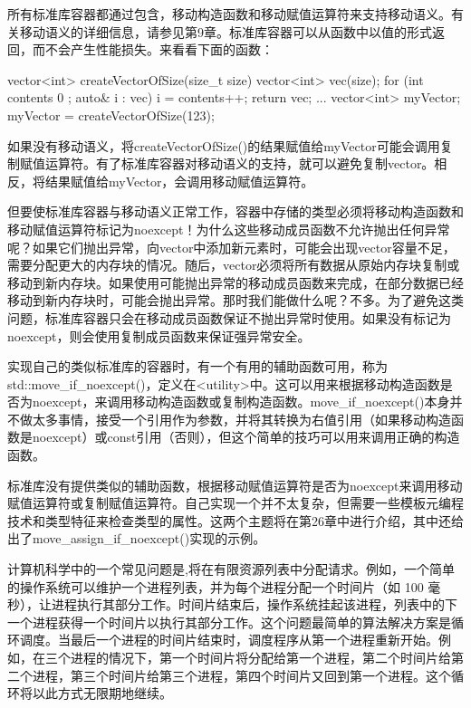 所有标准库容器都通过包含，移动构造函数和移动赋值运算符来支持移动语义。有关移动语义的详细信息，请参见第9章。标准库容器可以从函数中以值的形式返回，而不会产生性能损失。来看看下面的函数：

\begin{cpp}
vector<int> createVectorOfSize(size_t size)
{
    vector<int> vec(size);
    for (int contents { 0 }; auto& i : vec) { i = contents++; }
    return vec;
}
...
vector<int> myVector;
myVector = createVectorOfSize(123);
\end{cpp}

如果没有移动语义，将createVectorOfSize()的结果赋值给myVector可能会调用复制赋值运算符。有了标准库容器对移动语义的支持，就可以避免复制vector。相反，将结果赋值给myVector，会调用移动赋值运算符。

但要使标准库容器与移动语义正常工作，容器中存储的类型必须将移动构造函数和移动赋值运算符标记为noexcept！为什么这些移动成员函数不允许抛出任何异常呢？如果它们抛出异常，向vector中添加新元素时，可能会出现vector容量不足，需要分配更大的内存块的情况。随后，vector必须将所有数据从原始内存块复制或移动到新内存块。如果使用可能抛出异常的移动成员函数来完成，在部分数据已经移动到新内存块时，可能会抛出异常。那时我们能做什么呢？不多。为了避免这类问题，标准库容器只会在移动成员函数保证不抛出异常时使用。如果没有标记为noexcept，则会使用复制成员函数来保证强异常安全。

实现自己的类似标准库的容器时，有一个有用的辅助函数可用，称为std::move\_if\_noexcept()，定义在<utility>中。这可以用来根据移动构造函数是否为noexcept，来调用移动构造函数或复制构造函数。move\_if\_noexcept()本身并不做太多事情，接受一个引用作为参数，并将其转换为右值引用（如果移动构造函数是noexcept）或const引用（否则），但这个简单的技巧可以用来调用正确的构造函数。

标准库没有提供类似的辅助函数，根据移动赋值运算符是否为noexcept来调用移动赋值运算符或复制赋值运算符。自己实现一个并不太复杂，但需要一些模板元编程技术和类型特征来检查类型的属性。这两个主题将在第26章中进行介绍，其中还给出了move\_assign\_if\_noexcept()实现的示例。


计算机科学中的一个常见问题是,将在有限资源列表中分配请求。例如，一个简单的操作系统可以维护一个进程列表，并为每个进程分配一个时间片（如 100 毫秒），让进程执行其部分工作。时间片结束后，操作系统挂起该进程，列表中的下一个进程获得一个时间片以执行其部分工作。这个问题最简单的算法解决方案是循环调度。当最后一个进程的时间片结束时，调度程序从第一个进程重新开始。例如，在三个进程的情况下，第一个时间片将分配给第一个进程，第二个时间片给第二个进程，第三个时间片给第三个进程，第四个时间片又回到第一个进程。这个循环将以此方式无限期地继续。

